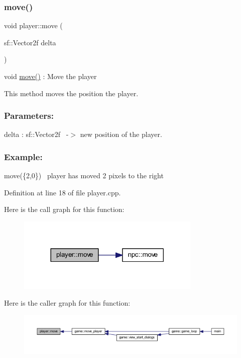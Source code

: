 \subsubsection{\texorpdfstring{move()}{move()}}
{\footnotesize\ttfamily void player\+::move (\begin{DoxyParamCaption}\item[{sf\+::\+Vector2f}]{delta }\end{DoxyParamCaption})}



void \hyperlink{classplayer_a0f6538451ec51b4407cca22294451443}{move()} \+: Move the player 

This method moves the position the player.~\newline


\subsubsection*{Parameters\+: }

delta \+: sf\+::\+Vector2f~\newline
-\/$>$ new position of the player.

\subsubsection*{Example\+: }

move(\{2,0\})~\newline
player has moved 2 pixels to the right~\newline


Definition at line 18 of file player.\+cpp.

Here is the call graph for this function\+:
\nopagebreak
\begin{figure}[H]
\begin{center}
\leavevmode
\includegraphics[width=248pt]{classplayer_a0f6538451ec51b4407cca22294451443_cgraph}
\end{center}
\end{figure}
Here is the caller graph for this function\+:
\nopagebreak
\begin{figure}[H]
\begin{center}
\leavevmode
\includegraphics[width=350pt]{classplayer_a0f6538451ec51b4407cca22294451443_icgraph}
\end{center}
\end{figure}
\mbox{\label{classplayer_a519784459639f6b785bcfeaa05b6f604}} 
